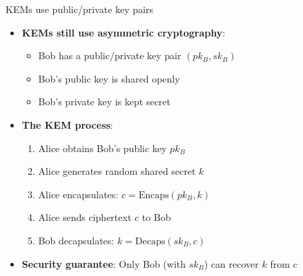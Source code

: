 \documentclass[aspectratio=169, lualatex, handout]{beamer}
\begin{document}
\begin{frame}{KEMs use public/private key pairs}
	\begin{itemize}
		\item \textbf{KEMs still use asymmetric cryptography}:
		      \begin{itemize}
			      \item Bob has a public/private key pair $(pk_B, sk_B)$
			      \item Bob's public key is shared openly
			      \item Bob's private key is kept secret
		      \end{itemize}
		\item \textbf{The KEM process}:
		      \begin{enumerate}
			      \item Alice obtains Bob's public key $pk_B$
			      \item Alice generates random shared secret $k$
			      \item Alice encapsulates: $c = \text{Encaps}(pk_B, k)$
			      \item Alice sends ciphertext $c$ to Bob
			      \item Bob decapsulates: $k = \text{Decaps}(sk_B, c)$
		      \end{enumerate}
		\item \textbf{Security guarantee}: Only Bob (with $sk_B$) can recover $k$ from $c$
	\end{itemize}
\end{frame}
\end{document}
